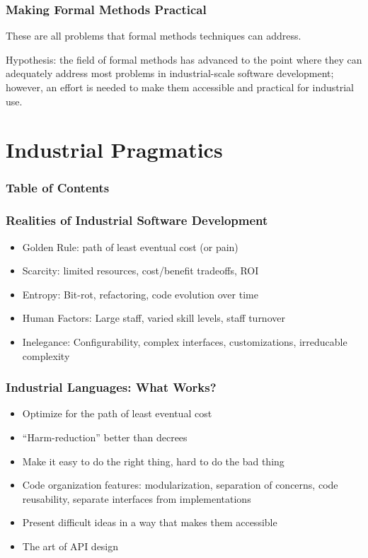\documentclass{beamer}
\begin{document}
\begin{frame}
  \frametitle{Making Formal Methods Practical}

  These are all problems that formal methods techniques can address.

  Hypothesis: the field of formal methods has advanced to the point
  where they can adequately address most problems in industrial-scale
  software development; however, an effort is needed to make them
  accessible and practical for industrial use.
\end{frame}

\section{Industrial Pragmatics}

\begin{frame}
  \frametitle{Table of Contents}
  \tableofcontents[currentsection]
\end{frame}

\begin{frame}
  \frametitle{Realities of Industrial Software Development}
  \begin{itemize}
    \item Golden Rule: path of least eventual cost (or pain)
    \item Scarcity: limited resources, cost/benefit tradeoffs, ROI
    \item Entropy: Bit-rot, refactoring, code evolution over time
    \item Human Factors: Large staff, varied skill levels, staff turnover
    \item Inelegance: Configurability, complex interfaces,
      customizations, irreducable complexity
  \end{itemize}
\end{frame}

\begin{frame}
  \frametitle{Industrial Languages: What Works?}
  \begin{itemize}
    \item Optimize for the path of least eventual cost
    \item ``Harm-reduction'' better than decrees
    \item Make it easy to do the right thing, hard to do the bad thing
    \item Code organization features: modularization, separation of
      concerns, code reusability, separate interfaces from
      implementations
    \item Present difficult ideas in a way that makes them accessible
    \item The art of API design
  \end{itemize}
\end{frame}
\end{document}
